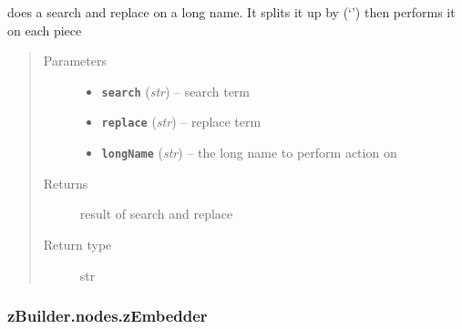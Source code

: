 \documentclass[letterpaper,10pt,english]{sphinxmanual}
\begin{document}
\begin{fulllineitems}
\label{zBuilder.nodes:zBuilder.nodes.base.replace_longname}
does a search and replace on a long name.  It splits it up by (`\textbar{}') then
performs it on each piece
\begin{quote}\begin{description}
\item[{Parameters}] \leavevmode\begin{itemize}
\item {} 
\textbf{\texttt{search}} (\emph{str}) -- search term

\item {} 
\textbf{\texttt{replace}} (\emph{str}) -- replace term

\item {} 
\textbf{\texttt{longName}} (\emph{str}) -- the long name to perform action on

\end{itemize}

\item[{Returns}] \leavevmode
result of search and replace

\item[{Return type}] \leavevmode
str

\end{description}\end{quote}

\end{fulllineitems}


\begin{fulllineitems}
\label{zBuilder.nodes:zBuilder.nodes.base.set_attrs}
\end{fulllineitems}



\subsubsection{zBuilder.nodes.zEmbedder}
\label{zBuilder.nodes:module-zBuilder.nodes.zEmbedder}\label{zBuilder.nodes:zbuilder-nodes-zembedder}
\end{document}
